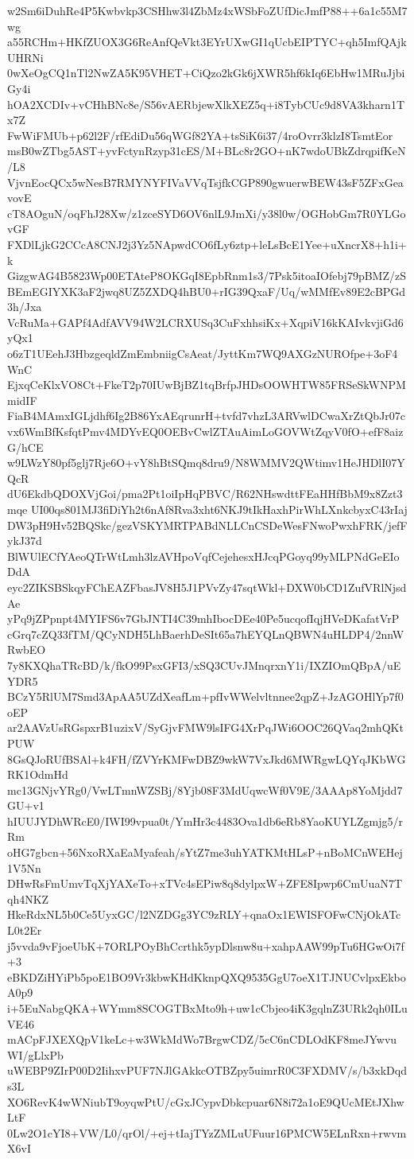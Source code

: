 w2Sm6iDuhRe4P5Kwbvkp3CSHhw3l4ZbMz4xWSbFoZUfDicJmfP88++6a1c55M7wg
a55RCHm+HKfZUOX3G6ReAnfQeVkt3EYrUXwGI1qUcbEIPTYC+qh5ImfQAjkUHRNi
0wXeOgCQ1nTl2NwZA5K95VHET+CiQzo2kGk6jXWR5hf6kIq6EbHw1MRuJjbiGy4i
hOA2XCDIv+vCHhBNc8e/S56vAERbjewXlkXEZ5q+i8TybCUc9d8VA3kharn1Tx7Z
FwWiFMUb+p62l2F/rfEdiDu56qWGf82YA+tsSiK6i37/4roOvrr3klzI8TsmtEor
msB0wZTbg5AST+yvFctynRzyp31cES/M+BLc8r2GO+nK7wdoUBkZdrqpifKeN/L8
VjvnEocQCx5wNesB7RMYNYFIVaVVqTsjfkCGP890gwuerwBEW43sF5ZFxGeavovE
cT8AOguN/oqFhJ28Xw/z1zceSYD6OV6nlL9JmXi/y38l0w/OGHobGm7R0YLGovGF
FXDlLjkG2CCcA8CNJ2j3Yz5NApwdCO6fLy6ztp+leLsBcE1Yee+uXncrX8+h1i+k
GizgwAG4B5823Wp00ETAteP8OKGqI8EpbRnm1s3/7Psk5itoaIOfebj79pBMZ/zS
BEmEGIYXK3aF2jwq8UZ5ZXDQ4hBU0+rIG39QxaF/Uq/wMMfEv89E2cBPGd3h/Jxa
VcRuMa+GAPf4AdfAVV94W2LCRXUSq3CuFxhhsiKx+XqpiV16kKAIvkvjiGd6yQx1
o6zT1UEehJ3HbzgeqldZmEmbniigCsAeat/JyttKm7WQ9AXGzNUROfpe+3oF4WnC
EjxqCeKlxVO8Ct+FkeT2p70IUwBjBZ1tqBrfpJHDsOOWHTW85FRSeSkWNPMmidIF
FiaB4MAmxIGLjdhf6Ig2B86YxAEqrunrH+tvfd7vhzL3ARVwlDCwaXrZtQbJr07c
vx6WmBfKsfqtPmv4MDYvEQ0OEBvCwlZTAuAimLoGOVWtZqyV0fO+efF8aizG/hCE
w9LWzY80pf5glj7Rje6O+vY8hBtSQmq8dru9/N8WMMV2QWtimv1HeJHDlI07YQcR
dU6EkdbQDOXVjGoi/pma2Pt1oiIpHqPBVC/R62NHswdttFEaHHfBbM9x8Zzt3mqe
UI00qs801MJ3fiDiYh2t6nAf8Rva3xht6NKJ9tIkHaxhPirWhLXnkcbyxC43rIaj
DW3pH9Hv52BQSkc/gezVSKYMRTPABdNLLCnCSDeWesFNwoPwxhFRK/jefFykJ37d
BlWUlECfYAeoQTrWtLmh3lzAVHpoVqfCejehesxHJcqPGoyq99yMLPNdGeEIoDdA
eyc2ZIKSBSkqyFChEAZFbasJV8H5J1PVvZy47sqtWkl+DXW0bCD1ZufVRlNjsdAe
yPq9jZPpnpt4MYIFS6v7GbJNTI4C39mhIbocDEe40Pe5ucqofIqjHVeDKafatVrP
cGrq7cZQ33fTM/QCyNDH5LhBaerhDeSIt65a7hEYQLnQBWN4uHLDP4/2nnWRwbEO
7y8KXQhaTRcBD/k/fkO99PsxGFI3/xSQ3CUvJMnqrxnY1i/IXZIOmQBpA/uEYDR5
BCzY5RlUM7Smd3ApAA5UZdXeafLm+pfIvWWelvltnnee2qpZ+JzAGOHlYp7f0oEP
ar2AAVzUsRGspxrB1uzixV/SyGjvFMW9lsIFG4XrPqJWi6OOC26QVaq2mhQKtPUW
8GsQJoRUfBSAl+k4FH/fZVYrKMFwDBZ9wkW7VxJkd6MWRgwLQYqJKbWGRK1OdmHd
mc13GNjvYRg0/VwLTmnWZSBj/8Yjb08F3MdUqwcWf0V9E/3AAAp8YoMjdd7GU+v1
hIUUJYDhWRcE0/IWI99vpua0t/YmHr3c4483Ova1db6eRb8YaoKUYLZgmjg5/rRm
oHG7gbcn+56NxoRXaEaMyafeah/sYtZ7me3uhYATKMtHLsP+nBoMCnWEHej1V5Nn
DHwRsFmUmvTqXjYAXeTo+xTVc4sEPiw8q8dylpxW+ZFE8Ipwp6CmUuaN7Tqh4NKZ
HkeRdxNL5b0Ce5UyxGC/l2NZDGg3YC9zRLY+qnaOx1EWISFOFwCNjOkATcL0t2Er
j5vvda9vFjoeUbK+7ORLPOyBhCcrthk5ypDlsnw8u+xahpAAW99pTu6HGwOi7f+3
eBKDZiHYiPb5poE1BO9Vr3kbwKHdKknpQXQ9535GgU7oeX1TJNUCvlpxEkboA0p9
i+5EuNabgQKA+WYmm8SCOGTBxMto9h+uw1cCbjeo4iK3gqlnZ3URk2qh0ILuVE46
mACpFJXEXQpV1keLc+w3WkMdWo7BrgwCDZ/5cC6nCDLOdKF8meJYwvuWI/gLlxPb
uWEBP9ZIrP00D2IihxvPUF7NJlGAkkcOTBZpy5uimrR0C3FXDMV/s/b3xkDqds3L
XO6RevK4wWNiubT9oyqwPtU/cGxJCypvDbkcpuar6N8i72a1oE9QUcMEtJXhwLtF
0Lw2O1cYI8+VW/L0/qrOl/+ej+tIajTYzZMLuUFuur16PMCW5ELnRxn+rwvmX6vI
